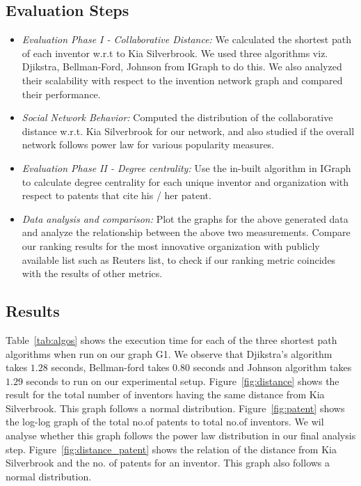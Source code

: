 \subsection{Evaluation Steps}
	\begin{itemize}
		\squish
		\item {\em Evaluation Phase I - Collaborative Distance:} We calculated the 
		shortest path of each inventor w.r.t to Kia Silverbrook. We used three
		algorithms viz. Djikstra, Bellman-Ford, Johnson from IGraph to do this. We
		also analyzed their scalability with respect to the invention network graph
		and compared their performance.
		\item {\em Social Network Behavior:} Computed the distribution of the 
		collaborative distance w.r.t. Kia Silverbrook for our network, and also studied
		if the overall network follows power law for various popularity measures.
		\item {\em Evaluation Phase II - Degree centrality:} Use the in-built
		algorithm in IGraph to calculate degree centrality
		for each unique inventor and organization with respect to patents that cite his / her patent.
		\item {\em Data analysis and comparison:} Plot the graphs for the above
		generated data and analyze the relationship between the above two
		measurements. Compare our ranking results for the most innovative organization
		with publicly available list such as Reuters list, to check if our ranking
		metric coincides with the results of other metrics.
	\end{itemize}

\subsection{Results}
Table~\ref{tab:algos} shows the execution time for each of the three shortest
path algorithms  when run on our graph G1. We observe that Djikstra's
algorithm takes $1.28$ seconds, Bellman-ford takes $0.80$ seconds and Johnson
algorithm takes $1.29$ seconds to run on our experimental setup.
Figure~\ref{fig:distance} shows the result for the total number of inventors
having the same distance from Kia Silverbrook. This graph follows a normal
distribution. Figure~\ref{fig:patent} shows the log-log graph of the total
no.of patents to total no.of inventors. We wil analyse whether this graph
follows the power law distribution in our  final analysis step.
Figure~\ref{fig:distance_patent} shows the relation of the distance from
Kia Silverbrook and the no. of patents for an inventor. This graph also follows a
normal distribution.

